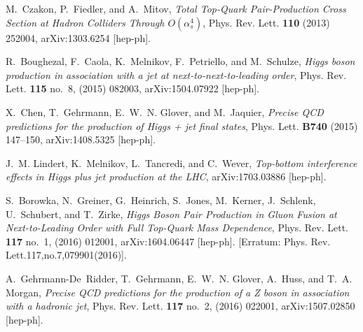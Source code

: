 \documentclass[a4paper,12pt]{scrartcl}
\begin{document}
\providecommand{\href}[2]{#2}\begingroup\raggedright\begin{thebibliography}{10}

M.~Czakon, P.~Fiedler, and A.~Mitov, {\em {Total Top-Quark Pair-Production
  Cross Section at Hadron Colliders Through $O(\alpha_s^4)$}},
  \href{http://dx.doi.org/10.1103/PhysRevLett.110.252004}{Phys. Rev. Lett.
  {\bfseries 110} (2013) 252004},
\href{http://arxiv.org/abs/1303.6254}{{\ttfamily arXiv:1303.6254 [hep-ph]}}.

R.~Boughezal, F.~Caola, K.~Melnikov, F.~Petriello, and M.~Schulze, {\em {Higgs
  boson production in association with a jet at next-to-next-to-leading
  order}}, \href{http://dx.doi.org/10.1103/PhysRevLett.115.082003}{Phys. Rev.
  Lett. {\bfseries 115} no.~8, (2015) 082003},
\href{http://arxiv.org/abs/1504.07922}{{\ttfamily arXiv:1504.07922 [hep-ph]}}.

X.~Chen, T.~Gehrmann, E.~W.~N. Glover, and M.~Jaquier, {\em {Precise QCD
  predictions for the production of Higgs + jet final states}},
  \href{http://dx.doi.org/10.1016/j.physletb.2014.11.021}{Phys. Lett.
  {\bfseries B740} (2015) 147--150},
\href{http://arxiv.org/abs/1408.5325}{{\ttfamily arXiv:1408.5325 [hep-ph]}}.

J.~M. Lindert, K.~Melnikov, L.~Tancredi, and C.~Wever, {\em {Top-bottom
  interference effects in Higgs plus jet production at the LHC}},
\href{http://arxiv.org/abs/1703.03886}{{\ttfamily arXiv:1703.03886 [hep-ph]}}.

S.~Borowka, N.~Greiner, G.~Heinrich, S.~Jones, M.~Kerner, J.~Schlenk,
  U.~Schubert, and T.~Zirke, {\em {Higgs Boson Pair Production in Gluon Fusion
  at Next-to-Leading Order with Full Top-Quark Mass Dependence}},
  \href{http://dx.doi.org/10.1103/PhysRevLett.117.079901,
  10.1103/PhysRevLett.117.012001}{Phys. Rev. Lett. {\bfseries 117} no.~1,
  (2016) 012001}, \href{http://arxiv.org/abs/1604.06447}{{\ttfamily
  arXiv:1604.06447 [hep-ph]}}.
[Erratum: Phys. Rev. Lett.117,no.7,079901(2016)].

A.~Gehrmann-De~Ridder, T.~Gehrmann, E.~W.~N. Glover, A.~Huss, and T.~A. Morgan,
  {\em {Precise QCD predictions for the production of a Z boson in association
  with a hadronic jet}},
  \href{http://dx.doi.org/10.1103/PhysRevLett.117.022001}{Phys. Rev. Lett.
  {\bfseries 117} no.~2, (2016) 022001},
\href{http://arxiv.org/abs/1507.02850}{{\ttfamily arXiv:1507.02850 [hep-ph]}}.


\end{thebibliography}
\end{document}
